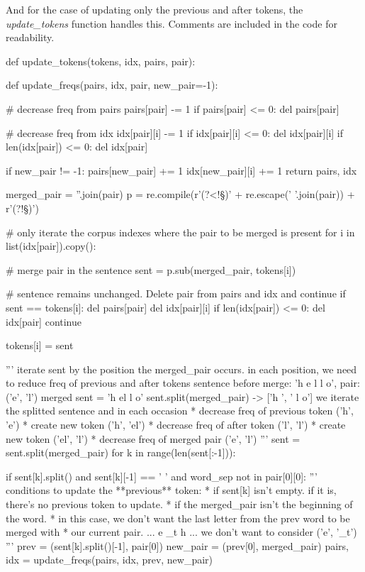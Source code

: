 And for the case of updating only the previous and after tokens, the \emph{update\_tokens} function handles this. Comments are included in the code for readability.

\begin{python}
def update_tokens(tokens, idx, pairs, pair):

  def update_freqs(pairs, idx, pair, new_pair=-1):

    # decrease freq from pairs
    pairs[pair] -= 1
    if pairs[pair] <= 0: del pairs[pair]

    # decrease freq from idx
    idx[pair][i] -= 1
    if idx[pair][i] <= 0: del idx[pair][i]
    if len(idx[pair]) <= 0: del idx[pair]

    if new_pair != -1:
      pairs[new_pair] += 1
      idx[new_pair][i] += 1
    return pairs, idx

  merged_pair = ''.join(pair)
  p = re.compile(r'(?<!\S)' + re.escape(' '.join(pair)) + r'(?!\S)')

  # only iterate the corpus indexes where the pair to be merged is present
  for i in list(idx[pair]).copy():

    # merge pair in the sentence
    sent = p.sub(merged_pair, tokens[i])

    # sentence remains unchanged. Delete pair from pairs and idx and continue
    if sent == tokens[i]:
      del pairs[pair]
      del idx[pair][i]
      if len(idx[pair]) <= 0:
        del idx[pair]
      continue

    tokens[i] = sent

    '''
    iterate sent by the position the merged_pair occurs. 
    in each position, we need to reduce freq of previous and after tokens
    sentence before merge: 'h e l l o', pair: ('e', 'l')
    merged sent = 'h el l o'
    sent.split(merged_pair) -> ['h ', ' l o']
    we iterate the splitted sentence and in each occasion
    * decrease freq of previous token ('h', 'e')
        * create new token ('h', 'el')
    * decrease freq of after token ('l', 'l')
        * create new token ('el', 'l')
    * decrease freq of merged pair ('e', 'l')
    '''
    sent = sent.split(merged_pair)
    for k in range(len(sent[:-1])):

      if sent[k].split() and sent[k][-1] == ' ' and word_sep not in pair[0][0]:
        '''
        conditions to update the **previous** token:
        * if sent[k] isn't empty. if it is, there's no previous token to update.
        * if the merged_pair isn't the beginning of the word.
          * in this case, we don't want the last letter from the prev word to be merged with
          * our current pair. ... e _t h ... we don't want to consider ('e', '_t')
        '''
        prev = (sent[k].split()[-1], pair[0])
        new_pair = (prev[0], merged_pair)
        pairs, idx = update_freqs(pairs, idx, prev, new_pair)


\end{python}
